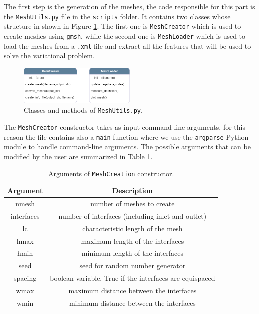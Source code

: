 \documentclass[11pt,a4paper]{article}
\begin{document}
The first step is the generation of the meshes, the code responsible for this part is the \texttt{MeshUtils.py} file in the \texttt{scripts} folder.
It contains two classes whose structure in shown in Figure \ref{mesh_class}. The first one is \texttt{MeshCreator} which is used to create meshes using \texttt{gmsh}, while the second one is  \texttt{MeshLoader} which is used to load the meshes from a \texttt{.xml} file and extract all the features that will be used to solve the variational problem.

\begin{figure}[H]
    \centering
    \includegraphics[width=0.5\textwidth]{Images/mesh_class.png}
    \caption{Classes and methods of \texttt{MeshUtils.py}.}
    \label{mesh_class}
\end{figure}

The \texttt{MeshCreator} constructor takes as input command-line arguments, for this reason the file contains also a \texttt{main} function where we use the \texttt{argparse} Python module to handle command-line arguments. 
The possible arguments that can be modified by the user are summarized in Table \ref{args}.

\begin{table}[H]
    \centering
    \begin{tabular}{|c|c|}
        \hline
        \textbf{Argument} & \textbf{Description} \\
        \hline
        nmesh & number of meshes to create \\
        interfaces & number of interfaces (including inlet and outlet)  \\
        lc & characteristic length of the mesh \\
        hmax & maximum length of the interfaces \\
        hmin & minimum length of the interfaces \\
        seed & seed for random number generator \\
        spacing & boolean variable, True if the interfaces are equispaced \\
        wmax & maximum distance between the interfaces \\
        wmin & minimum distance between the interfaces \\
        \hline   
    \end{tabular}
    \caption{Arguments of \texttt{MeshCreation} constructor.}
    \label{args}
\end{table}
\end{document}
